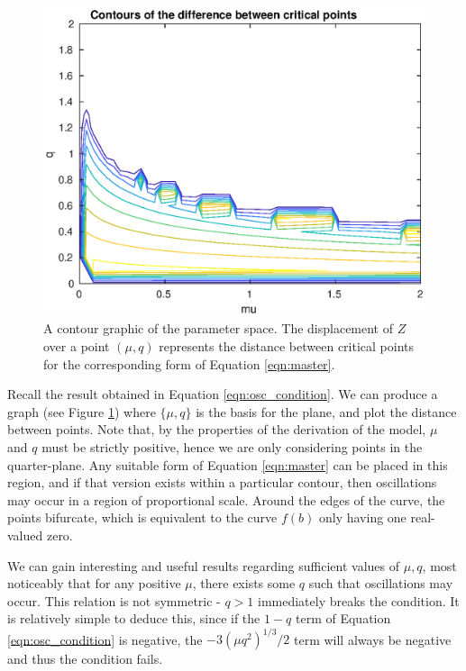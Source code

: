 \documentclass{article}
\begin{document}
\begin{figure}
	\centering
	\includegraphics[width=\linewidth]{param_space}
	\caption{A contour graphic of the parameter space. The displacement of $Z$ over a point $(\mu,q)$ represents the distance between critical points for the corresponding form of Equation \ref{eqn:master}.}
	\label{fig:param_space}
\end{figure}


Recall the result obtained in Equation \ref{eqn:osc_condition}.
We can produce a graph (see Figure \ref{fig:param_space}) where $\{\mu, q\}$ is the basis for the plane, and plot the distance between points.
Note that, by the properties of the derivation of the model,
$\mu$ and $q$ must be strictly positive,
hence we are only considering points in the quarter-plane.
Any suitable form of Equation \ref{eqn:master} can be placed in this region,
and if that version exists within a particular contour,
then oscillations may occur in a region of proportional scale.
Around the edges of the curve, the points bifurcate,
which is equivalent to the curve $f(b)$ only having one real-valued zero.

We can gain interesting and useful results regarding sufficient values of $\mu, q$,
most noticeably that for any positive $\mu$, there exists some $q$ such that oscillations may occur.
This relation is not symmetric - $q>1$ immediately breaks the condition.
It is relatively simple to deduce this, since if the $1-q$ term of Equation \ref{eqn:osc_condition} is negative,
the $-3(\mu q^2)^{1/3}/2$ term will always be negative and thus the condition fails.
\end{document}
